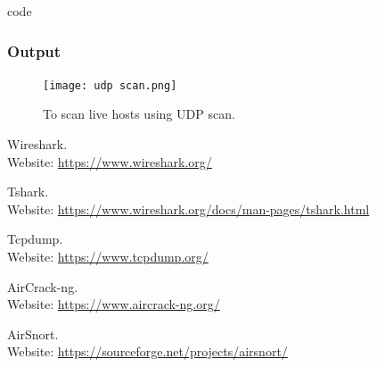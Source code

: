 code \documentclass[11pt]{article}
\begin{document}
\subsubsection*{Output}
\begin{figure}[H]
    \centering
    \texttt{[image: udp scan.png]}
    \caption{To scan live hosts using UDP scan.}
    \label{fig:1}
\end{figure}


\clearpage
\begin{thebibliography}{99}
	Wireshark. \\
	Website: \url{https://www.wireshark.org/}

	Tshark. \\
	Website: \url{https://www.wireshark.org/docs/man-pages/tshark.html}

	Tcpdump. \\
	Website: \url{https://www.tcpdump.org/}

	AirCrack-ng. \\
	Website: \url{https://www.aircrack-ng.org/}

	AirSnort. \\
	Website: \url{https://sourceforge.net/projects/airsnort/}
\end{thebibliography}
\end{document}

